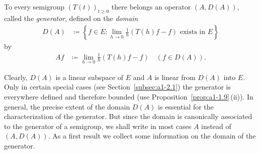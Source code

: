 \begin{definition}\label{def:a1-1.5}
To every semigroup $(T(t))_{t \geq 0}$ there belongs an operator $(A,D(A))$, 
called the \emph{generator}, defined on the \emph{domain}
\begin{align*}
    D(A) &\coloneq \left\{ f \in E \colon \lim_{h\to0} \frac{1}{h} (T(h)f - f)
             \text{ exists in } E \right\}
\end{align*}
by
\begin{align*}
    Af &\coloneq \lim_{h\to0} \frac{1}{h} (T(h)f - f) \quad (f \in D(A)).
\end{align*}
\end{definition}
Clearly, $D(A)$ is a linear subspace of\/ $E$ and $A$ is linear from $D(A)$ into $E$.
Only in certain special cases (see Section~\ref{subsec:a1-2.1}) the generator
is everywhere defined and therefore bounded (use Proposition~\ref{prop:a1-1.9}\,(ii)). 
In general, the precise extent of the domain $D(A)$ is essential for the characterization of the generator.
But since the domain is canonically associated to the generator of a semigroup, we shall write in most cases $A$ instead of\/ $(A,D(A))$.
As a first result we collect some information on the domain of the generator.
